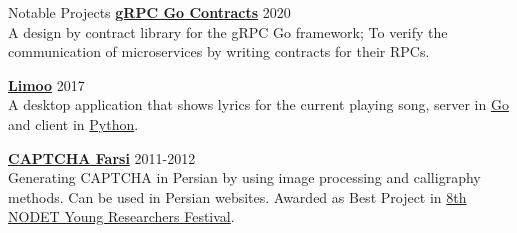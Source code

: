 \documentclass{resume} %
\begin{document}
\begin{rSection}{Notable Projects}
    {\bf \href{https://github.com/shayanh/grpc-go-contracts}{gRPC Go Contracts}} \hfill 2020
    \\A design by contract library for the gRPC Go framework; To verify the communication of microservices by writing contracts for their RPCs.

%
%

	{\bf \href{https://github.com/shayanh/limoo}{Limoo}} \hfill 2017
	\\A desktop application that shows lyrics for the current playing song, server in \href{https://github.com/shayanh/limoo-server}{Go} and client in \href{https://github.com/shayanh/limoo}{Python}.

	{\bf \href{https://github.com/KhassTeam/Persian-CAPTCHA}{CAPTCHA Farsi}} \hfill 2011-2012
	\\Generating CAPTCHA in Persian by using image processing and calligraphy methods. Can be used in Persian websites. Awarded as Best Project in
	\href{https://www.helli.ir/portal/content/%D8%AA%D9%82%D8%AF%DB%8C%D8%B1-%D8%A7%D8%B2-%D8%AF%D8%A7%D9%86%D8%B4-%D8%A2%D9%85%D9%88%D8%B2%D8%A7%D9%86-%D8%A8%D8%B1%D8%AA%D8%B1%D9%BE%DA%98%D9%88%D9%87%D8%B4%DA%AF%D8%B1}
		{8th NODET Young Researchers Festival}.
\end{rSection}
\end{document}
